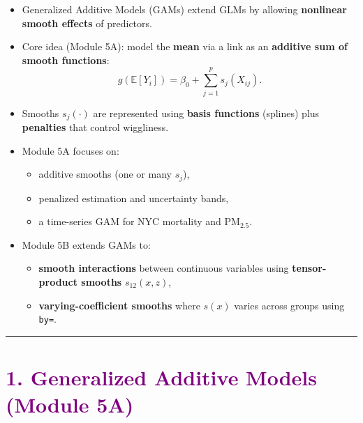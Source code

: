 \documentclass[
  letterpaper,
  DIV=11,
  numbers=noendperiod]{scrreprt}
\providecommand{\tightlist}{%
  \setlength{\itemsep}{0pt}\setlength{\parskip}{0pt}}\usepackage{longtable,booktabs,array}
\begin{document}
\markright{\textcolor{purple}{Overview}}

\begin{itemize}
\tightlist
\item
  Generalized Additive Models (GAMs) extend GLMs by allowing
  \textbf{nonlinear smooth effects} of predictors.
\item
  Core idea (Module 5A): model the \textbf{mean} via a link as an
  \textbf{additive sum of smooth functions}: \[
  g(\mathbb{E}[Y_i]) = \beta_0 + \sum_{j=1}^p s_j(X_{ij}).
  \]
\item
  Smooths \(s_j(\cdot)\) are represented using \textbf{basis functions}
  (splines) plus \textbf{penalties} that control wiggliness.
\item
  Module 5A focuses on:

  \begin{itemize}
  \tightlist
  \item
    additive smooths (one or many \(s_j\)),
  \item
    penalized estimation and uncertainty bands,
  \item
    a time-series GAM for NYC mortality and PM\(_{2.5}\).
  \end{itemize}
\item
  Module 5B extends GAMs to:

  \begin{itemize}
  \tightlist
  \item
    \textbf{smooth interactions} between continuous variables using
    \textbf{tensor-product smooths} \(s_{12}(x,z)\),
  \item
    \textbf{varying-coefficient smooths} where \(s(x)\) varies across
    groups using \texttt{by=}.
  \end{itemize}
\end{itemize}

\begin{center}\rule{0.5\linewidth}{0.5pt}\end{center}

\hypertarget{section-43}{%
\section*{\texorpdfstring{\textcolor{purple}{1. Generalized Additive Models (Module 5A)}}{}}\label{section-43}}

\markright{\textcolor{purple}{1. Generalized Additive Models (Module 5A)}}
\end{document}
